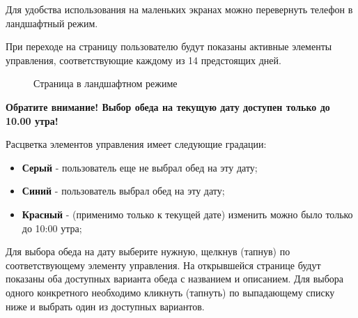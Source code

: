 \documentclass[a4paper]{article}
\begin{document}
Для удобства использования на маленьких экранах можно перевернуть телефон в ландшафтный режим.

При переходе на страницу пользователю будут показаны активные элементы управления, соответствующие каждому из 14 предстоящих дней. 

\begin{figure}[h!]
\caption{Страница в ландшафтном режиме}
\label{fig:image27}
\end{figure}

\textbf{Обратите внимание! Выбор обеда на текущую дату доступен только до 10.00 утра!}

Расцветка элементов управления имеет следующие градации:

\begin{itemize}
\setlength{\itemsep}{-2mm}
	\item \textbf{Серый} - пользователь еще не выбрал обед на эту дату;
	\item \textbf{Синий} - пользователь выбрал обед на эту дату;
	\item \textbf{Красный} - (применимо только к текущей дате) изменить можно было только до 10:00 утра;
\end{itemize}

Для выбора обеда на дату выберите нужную, щелкнув (тапнув) по соответствующему элементу управления. На открывшейся странице будут показаны оба доступных варианта обеда с названием и описанием. Для выбора одного конкретного необходимо кликнуть (тапнуть) по выпадающему списку ниже и выбрать один из доступных вариантов.
\end{document}
